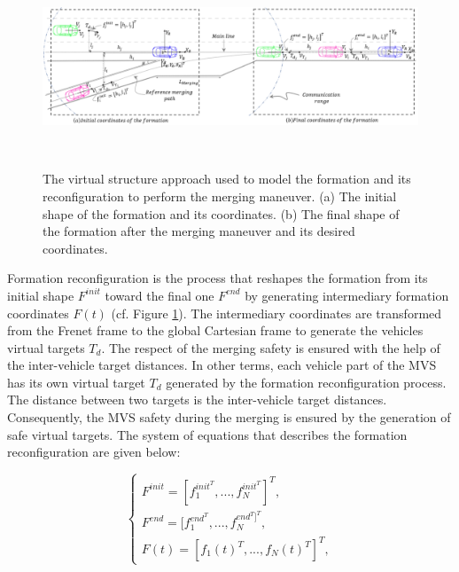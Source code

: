      \begin{figure}[!h]
        \centering 
        \includegraphics[width=13cm,height=6cm]{chapters/Chapitre_5/Figures/FullMergingScenario.pdf}
        \caption{The virtual structure approach used to model the formation and its reconfiguration to perform the merging maneuver. (a) The initial shape of the formation and its coordinates. (b) The final shape of the formation after the merging maneuver and its desired coordinates. }
        \label{fig:Coordinates_system_full_scenario}
        \end{figure}

Formation reconfiguration is the process that reshapes the formation from its initial shape $F^{init}$ toward the final one $F^{end}$ by generating intermediary formation coordinates $F(t)$ (cf. Figure \ref{fig:Coordinates_system_full_scenario}). The intermediary coordinates are transformed from the Frenet frame to the global Cartesian frame to generate the vehicles virtual targets $T_d$. The respect of the merging safety is ensured with the help of the inter-vehicle target distances. In other terms, each vehicle part of the MVS has its own virtual target $T_d$ generated by the formation reconfiguration process. The distance between two targets is the inter-vehicle target distances. Consequently, the MVS safety during the merging is ensured by the generation of safe virtual targets. The system of equations that describes the formation reconfiguration are given below: 
    


\begin{equation}\label{eq:initialandfinalcoordinates}
\begin{cases}
F^{init}=[f_{1}^{{init}^T}, ...,f_{N}^{{init}^T}]^T, \\
F^{end}=[f_{1}^{{end}^T}, ...,f_{N}^{{end}^T]^T},\\
F(t)=[f_{1}(t)^T, ...,f_{N}(t)^T]^T,
\end{cases}
\end{equation}

